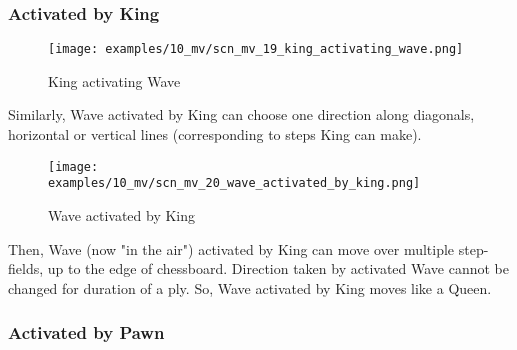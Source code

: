 \clearpage %

\subsubsection*{Activated by King}
\label{sec:Miranda's veil/Wave/Movement/Activated by King}

\vspace*{-1.4\baselineskip}
\noindent
\begin{figure}[h]
\texttt{[image: examples/10\_mv/scn\_mv\_19\_king\_activating\_wave.png]}
\caption{King activating Wave}
\label{fig:scn_mv_19_king_activating_wave}
\end{figure}

Similarly, Wave activated by King can choose one direction along diagonals, horizontal
or vertical lines (corresponding to steps King can make).

\clearpage %

\vspace*{-2.1\baselineskip}
\noindent
\begin{figure}[!h]
\texttt{[image: examples/10\_mv/scn\_mv\_20\_wave\_activated\_by\_king.png]}
\caption{Wave activated by King}
\label{fig:scn_mv_20_wave_activated_by_king}
\end{figure}

Then, Wave (now "in the air") activated by King can move over multiple step-fields,
up to the edge of chessboard. Direction taken by activated Wave cannot be changed
for duration of a ply. So, Wave activated by King moves like a Queen.

\clearpage %

\subsubsection*{Activated by Pawn}
\label{sec:Miranda's veil/Wave/Movement/Activated by Pawn}

